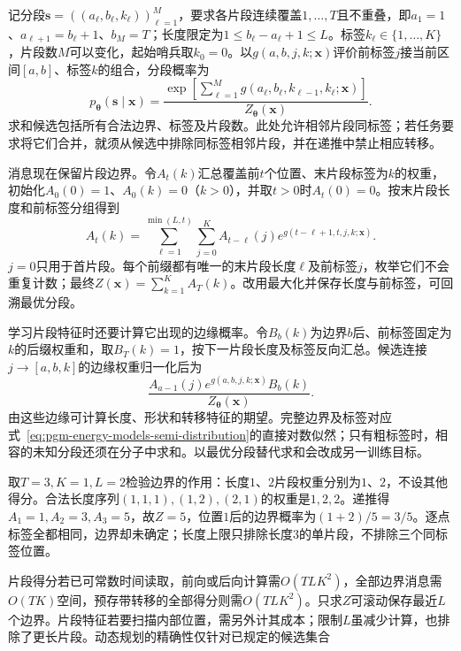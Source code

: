记分段$\bm{s}=((a_\ell,b_\ell,k_\ell))_{\ell=1}^M$，要求各片段连续覆盖$1,\ldots,T$且不重叠，即$a_1=1$、$a_{\ell+1}=b_\ell+1$、$b_M=T$；长度限定为$1\leq b_\ell-a_\ell+1\leq L$。标签$k_\ell\in\{1,\ldots,K\}$，片段数$M$可以变化，起始哨兵取$k_0=0$。以$g(a,b,j,k;\bm{x})$评价前标签$j$接当前区间$[a,b]$、标签$k$的组合，分段概率为
\begin{equation}
  p_{\bm{\theta}}(\bm{s}\mid\bm{x})
   =\frac{\exp\!\left[
        \sum_{\ell=1}^M
          g(a_\ell,b_\ell,k_{\ell-1},k_\ell;\bm{x})
                    \right]}
          {Z_{\bm{\theta}}(\bm{x})}.
  \label{eq:pgm-energy-models-semi-distribution}
\end{equation}
求和候选包括所有合法边界、标签及片段数。此处允许相邻片段同标签；若任务要求将它们合并，就须从候选中排除同标签相邻片段，并在递推中禁止相应转移。

消息现在保留片段边界。令$A_t(k)$汇总覆盖前$t$个位置、末片段标签为$k$的权重，初始化$A_0(0)=1$、$A_0(k)=0$（$k>0$），并取$t>0$时$A_t(0)=0$。按末片段长度和前标签分组得到
\begin{equation}
  A_t(k)=
    \sum_{\ell=1}^{\min(L,t)}\sum_{j=0}^K
       A_{t-\ell}(j)
       e^{g(t-\ell+1,t,j,k;\bm{x})}.
  \label{eq:pgm-energy-models-semi-forward}
\end{equation}
$j=0$只用于首片段。每个前缀都有唯一的末片段长度$\ell$及前标签$j$，枚举它们不会重复计数；最终$Z(\bm{x})=\sum_{k=1}^KA_T(k)$。改用最大化并保存长度与前标签，可回溯最优分段。

学习片段特征时还要计算它出现的边缘概率。令$B_b(k)$为边界$b$后、前标签固定为$k$的后缀权重和，取$B_T(k)=1$，按下一片段长度及标签反向汇总。候选连接$j\to[a,b,k]$的边缘权重归一化后为
\[
  \frac{A_{a-1}(j)
           e^{g(a,b,j,k;\bm{x})}B_b(k)}
       {Z_{\bm{\theta}}(\bm{x})}.
\]
由这些边缘可计算长度、形状和转移特征的期望。完整边界及标签对应式~\eqref{eq:pgm-energy-models-semi-distribution}的直接对数似然；只有粗标签时，相容的未知分段还须在分子中求和。以最优分段替代求和会改成另一训练目标。

取$T=3,K=1,L=2$检验边界的作用：长度$1$、$2$片段权重分别为$1$、$2$，不设其他得分。合法长度序列$(1,1,1),(1,2),(2,1)$的权重是$1,2,2$。递推得$A_1=1,A_2=3,A_3=5$，故$Z=5$，位置$1$后的边界概率为$(1+2)/5=3/5$。逐点标签全都相同，边界却未确定；长度上限只排除长度$3$的单片段，不排除三个同标签位置。

片段得分若已可常数时间读取，前向或后向计算需$O(TLK^2)$，全部边界消息需$O(TK)$空间，预存带转移的全部得分则需$O(TLK^2)$。只求$Z$可滚动保存最近$L$个边界。片段特征若要扫描内部位置，需另外计其成本；限制$L$虽减少计算，也排除了更长片段。动态规划的精确性仅针对已规定的候选集合

